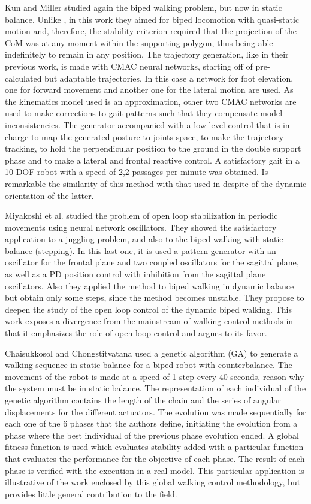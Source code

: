 Kun and Miller \cite{Kun97Adaptive} studied again the biped walking problem, but now in static balance. Unlike \cite{Kun96Adaptive}, in this work they aimed for biped locomotion with quasi-static motion and, therefore, the stability criterion required that the projection of the CoM was at any moment within the supporting polygon, thus being able indefinitely to remain in any position. The trajectory generation, like in their previous work, is made with CMAC neural networks, starting off of pre-calculated but adaptable trajectories. In this case a network for foot elevation, one for forward movement and another one for the lateral motion are used. As the kinematics model used  is an approximation, other two CMAC networks are used to make corrections to gait patterns such that they compensate model inconsistencies. The generator accompanied with a low level control that is in charge to map the generated posture to joints space, to make the trajectory tracking, to hold the perpendicular position to the ground in the double support phase and to make a lateral and frontal reactive control. A satisfactory gait in a 10-DOF robot with a speed of 2,2 passages per minute was obtained. Is remarkable the similarity of this method with that used in \cite{Kun96Adaptive} despite of the dynamic orientation of the latter.


Miyakoshi et al. \cite{Miyakoshi00Stabilization} studied the problem of open loop stabilization in periodic movements using neural network oscillators. They showed the satisfactory application to a juggling problem, and also to the biped walking with static balance (stepping). In this last one, it is used a pattern generator with an oscillator for the frontal plane and two coupled oscillators for the sagittal plane, as well as a PD position control with inhibition from the sagittal plane oscillators. Also they applied the method to biped walking in dynamic balance but obtain only some steps, since the method becomes unstable. They propose to deepen the study of the open loop control of the dynamic biped walking. This work exposes a divergence from the mainstream of walking control methods in that it emphasizes the role of open loop control and argues to its favor.


Chaisukkosol and Chongstitvatana \cite{Chaisukkosol01Automatic} used a genetic algorithm (GA) to generate a walking sequence in static balance for a biped robot with counterbalance. The movement of the robot is made at a speed of 1 step every 40 seconds, reason why the system must be in static balance. The representation of each individual of the genetic algorithm contains the length of the chain and the series of angular displacements for the different actuators. The evolution was made sequentially for each one of the 6 phases that the authors define, initiating the evolution from a phase where the best individual of the previous phase evolution ended. A global fitness function is used which evaluates stability added with a particular function that evaluates the performance for the objective of each phase. The result of each phase is verified with the execution in a real model. This particular application is illustrative of the work enclosed by this global walking control methodology, but provides little general contribution to the field.


